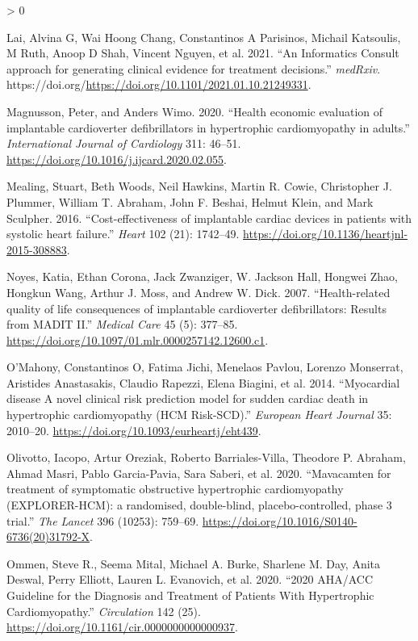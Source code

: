 \documentclass[
]{article}
\newlength{\cslhangindent}
\newenvironment{CSLReferences}[2] %
 {%
  \setlength{\parindent}{0pt}
  \ifodd #1 \everypar{\setlength{\hangindent}{\cslhangindent}}\ignorespaces\fi
  \ifnum #2 > 0
  \setlength{\parskip}{#2\baselineskip}
  \fi
 }%
 {}
\begin{document}
\begin{CSLReferences}{1}{0}
\leavevmode\hypertarget{ref-Lai2021}{}%
Lai, Alvina G, Wai Hoong Chang, Constantinos A Parisinos, Michail Katsoulis, M Ruth, Anoop D Shah, Vincent Nguyen, et al. 2021. {``{An Informatics Consult approach for generating clinical evidence for treatment decisions}.''} \emph{medRxiv}. https://doi.org/\url{https://doi.org/10.1101/2021.01.10.21249331}.

\leavevmode\hypertarget{ref-Magnusson2020}{}%
Magnusson, Peter, and Anders Wimo. 2020. {``{Health economic evaluation of implantable cardioverter defibrillators in hypertrophic cardiomyopathy in adults}.''} \emph{International Journal of Cardiology} 311: 46--51. \url{https://doi.org/10.1016/j.ijcard.2020.02.055}.

\leavevmode\hypertarget{ref-Mealing2016}{}%
Mealing, Stuart, Beth Woods, Neil Hawkins, Martin R. Cowie, Christopher J. Plummer, William T. Abraham, John F. Beshai, Helmut Klein, and Mark Sculpher. 2016. {``{Cost-effectiveness of implantable cardiac devices in patients with systolic heart failure}.''} \emph{Heart} 102 (21): 1742--49. \url{https://doi.org/10.1136/heartjnl-2015-308883}.

\leavevmode\hypertarget{ref-Noyes2007}{}%
Noyes, Katia, Ethan Corona, Jack Zwanziger, W. Jackson Hall, Hongwei Zhao, Hongkun Wang, Arthur J. Moss, and Andrew W. Dick. 2007. {``{Health-related quality of life consequences of implantable cardioverter defibrillators: Results from MADIT II}.''} \emph{Medical Care} 45 (5): 377--85. \url{https://doi.org/10.1097/01.mlr.0000257142.12600.c1}.

\leavevmode\hypertarget{ref-OMahony2014}{}%
O'Mahony, Constantinos O, Fatima Jichi, Menelaos Pavlou, Lorenzo Monserrat, Aristides Anastasakis, Claudio Rapezzi, Elena Biagini, et al. 2014. {``{Myocardial disease A novel clinical risk prediction model for sudden cardiac death in hypertrophic cardiomyopathy (HCM Risk-SCD)}.''} \emph{European Heart Journal} 35: 2010--20. \url{https://doi.org/10.1093/eurheartj/eht439}.

\leavevmode\hypertarget{ref-Olivotto2020}{}%
Olivotto, Iacopo, Artur Oreziak, Roberto Barriales-Villa, Theodore P. Abraham, Ahmad Masri, Pablo Garcia-Pavia, Sara Saberi, et al. 2020. {``{Mavacamten for treatment of symptomatic obstructive hypertrophic cardiomyopathy (EXPLORER-HCM): a randomised, double-blind, placebo-controlled, phase 3 trial}.''} \emph{The Lancet} 396 (10253): 759--69. \url{https://doi.org/10.1016/S0140-6736(20)31792-X}.

\leavevmode\hypertarget{ref-Ommen2020}{}%
Ommen, Steve R., Seema Mital, Michael A. Burke, Sharlene M. Day, Anita Deswal, Perry Elliott, Lauren L. Evanovich, et al. 2020. {``{2020 AHA/ACC Guideline for the Diagnosis and Treatment of Patients With Hypertrophic Cardiomyopathy}.''} \emph{Circulation} 142 (25). \url{https://doi.org/10.1161/cir.0000000000000937}.


\end{CSLReferences}
\end{document}
